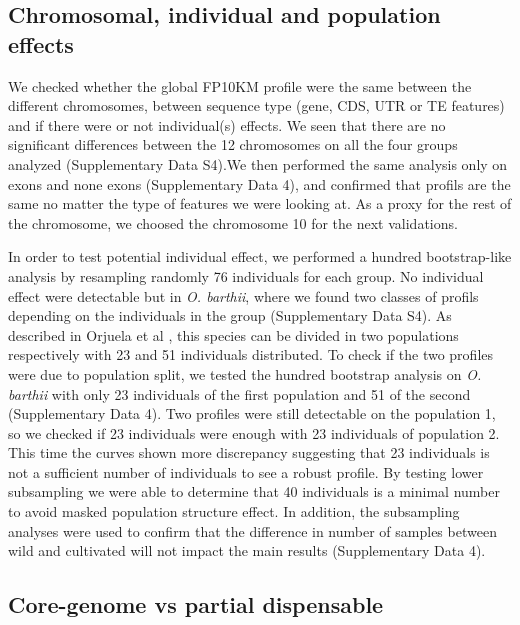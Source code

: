 \documentclass[10pt,letterpaper]{article}
\begin{document}
\subsection*{Chromosomal, individual and population effects}
We checked whether the global FP10KM profile were the same between the different chromosomes, between sequence type (gene, CDS, UTR or TE features) and if there were or not individual(s) effects. We seen that there are no significant differences between the 12 chromosomes on all the four groups analyzed (Supplementary Data S4).We then performed the same analysis only on exons and none exons  (Supplementary Data 4), and confirmed that profils are the same no matter the type of features we were looking at. As a proxy for the rest of the chromosome, we choosed the chromosome 10 for the next validations.

In order to test potential individual effect, we performed a hundred bootstrap-like analysis by resampling randomly 76 individuals for each group. No individual effect were detectable but in \textit{O. barthii}, where we found two classes of profils depending on the individuals in the group (Supplementary Data S4). As described in Orjuela et al \cite{Orjuela2014}, this species can be divided in two populations respectively with 23 and 51 individuals distributed.
To check if the two profiles were due to population split, we tested the hundred bootstrap analysis on \textit{O. barthii} with only 23 individuals of the first population and 51 of the second (Supplementary Data 4).
Two profiles were still detectable on the population 1, so we checked if 23 individuals were enough with 23 individuals of population 2. This time the curves shown more discrepancy suggesting that 23 individuals is not a sufficient number of individuals to see a robust profile. By testing lower subsampling we were able to determine that 40 individuals is a minimal number to avoid masked population structure effect.
In addition, the subsampling analyses were used to confirm that the difference in number of samples between wild and cultivated will not impact the main results (Supplementary Data 4).


\subsection*{Core-genome vs partial dispensable}


\end{document}
